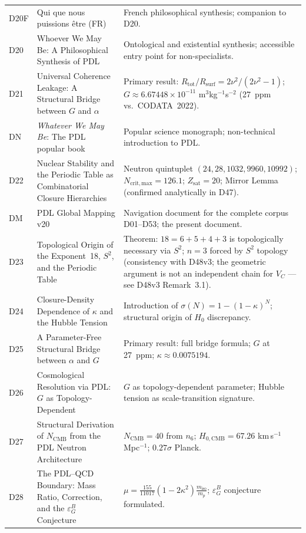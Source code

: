 \documentclass[11pt,a4paper]{article}
\theoremstyle{plain}
\theoremstyle{definition}
\theoremstyle{remark}
\newcommand{\epsGeomB}{\varepsilon_G^B}
\begin{document}
\begin{longtable}{L{1.3cm}L{3.8cm}L{8.0cm}}
D20F & Qui que nous puissions \^etre (FR)~\cite{D20F} & French philosophical synthesis; companion to D20.\\[0.3em]
D20 & Whoever We May Be: A Philosophical Synthesis of PDL~\cite{D20} & Ontological and existential synthesis; accessible entry point for non-specialists.\\[0.3em]
D21 & Universal Coherence Leakage: A Structural Bridge between $G$ and $\alpha$~\cite{D21} & \textcolor{proofblue}{Primary result}: $R_{\mathrm{tot}}/R_{\mathrm{surf}} = 2\nu^2/(2\nu^2-1)$; $G \approx 6.67448\times 10^{-11}$ m$^3$kg$^{-1}$s$^{-2}$ (27~ppm vs.\ CODATA~2022).\\[0.3em]
DN & \emph{Whatever We May Be}: The PDL popular book~\cite{DN} & Popular science monograph; non-technical introduction to PDL.\\[0.3em]
D22 & Nuclear Stability and the Periodic Table as Combinatorial Closure Hierarchies~\cite{D22} & Neutron quintuplet $(24,28,1032,9960,10992)$; $N_{\mathrm{crit,max}}=126.1$; $Z_{\mathrm{sat}}=20$; Mirror Lemma (confirmed analytically in D47).\\[0.3em]
DM & PDL Global Mapping v20~\cite{DMapv10} & Navigation document for the complete corpus D01--D53; the present document.\\[0.3em]
D23 & Topological Origin of the Exponent~18, $S^2$, and the Periodic Table~\cite{D23} & \textcolor{proofblue}{Theorem}: $18=6+5+4+3$ is topologically necessary via $S^2$; $n=3$ forced by $S^2$ topology (consistency with D48v3; the geometric argument is not an independent chain for $V_C$ --- see D48v3 Remark~3.1).\\[0.3em]
D24 & Closure-Density Dependence of $\kappa$ and the Hubble Tension~\cite{D24} & Introduction of $\sigma(N)=1-(1-\kappa)^N$; structural origin of $H_0$ discrepancy.\\[0.3em]
D25 & A Parameter-Free Structural Bridge between $\alpha$ and $G$~\cite{D25} & \textcolor{proofblue}{Primary result}: full bridge formula; $G$ at 27~ppm; $\kappa\approx 0.0075194$.\\[0.3em]
D26 & Cosmological Resolution via PDL: $G$ as Topology-Dependent~\cite{D26} & $G$ as topology-dependent parameter; Hubble tension as scale-transition signature.\\[0.3em]
D27 & Structural Derivation of $N_{\mathrm{CMB}}$ from the PDL Neutron Architecture~\cite{D27} & $N_{\mathrm{CMB}}=40$ from $n_6$; $H_{0,\mathrm{CMB}}=67.26$ km\,s$^{-1}$\,Mpc$^{-1}$; $0.27\sigma$ Planck.\\[0.3em]
D28 & The PDL--QCD Boundary: Mass Ratio, Correction, and the $\epsGeomB$ Conjecture~\cite{D28} & $\mu = \frac{155}{11017}(1-2\kappa^2)\frac{m_{\mathrm{iso}}}{m_p}$; $\epsGeomB$ conjecture formulated.\\[0.3em]

\end{longtable}
\end{document}
